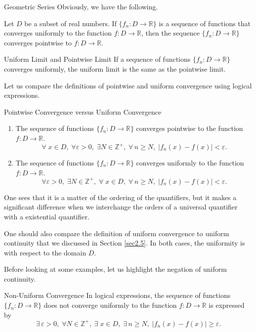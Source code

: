 \begin{example}[label=230305_16]{Geometric Series}
Obviously,  we have the following.
\begin{proposition}{}
Let $D$ be a subset of real numbers. If  $\{f_n:D\to\mathbb{R}\}$ is a sequence of functions that converges uniformly to the function $f:D\to\mathbb{R}$, then the sequence $\{f_n:D\to\mathbb{R}\}$  converges pointwise to  $f:D\to\mathbb{R}$.
\end{proposition}
\begin{highlight}{Uniform Limit and Pointwise Limit}
If a sequence of functions $\{f_n:D\to\mathbb{R}\}$  converges uniformly, the uniform limit is the same as the pointwise limit.
\end{highlight}



Let us compare the definitions of pointwise  and uniform convergence using logical expressions.
\begin{highlight}{Pointwise Convergence versus Uniform Convergence}
\begin{enumerate}[$\bullet$\;\;]
\item
The sequence of functions $\{f_n:D\to\mathbb{R}\}$ converges pointwise to the function $f:D\to\mathbb{R}$.
\[\forall\;x\in D,\; \forall \varepsilon>0,\;\exists N\in\mathbb{Z}^+,\;\forall \,n\geq N,\;|f_n(x)-f(x)|<\varepsilon.\]
\item
The sequence of functions $\{f_n:D\to\mathbb{R}\}$ converges uniformly to the function $f:D\to\mathbb{R}$.
\[\forall \varepsilon>0,\;\exists N\in\mathbb{Z}^+,\;\forall\;x\in D,\; \forall \,n\geq N,\;|f_n(x)-f(x)|<\varepsilon.\]
\end{enumerate}
\end{highlight}
One sees that it is a matter of the ordering of the quantifiers, but it makes a significant difference when we interchange the orders of a universal quantifier with  a existential quantifier.

 One should also compare the definition of uniform convergence to uniform continuity that we discussed in Section \ref{sec2.5}. In both cases, the uniformity is with respect to the domain $D$.

Before looking at some examples, let us highlight the negation of uniform continuity.
\begin{highlight}{Non-Uniform Convergence}
In logical expressions, the sequence of functions $\{f_n:D\to\mathbb{R}\}$ does not converge uniformly to the function $f:D\to\mathbb{R}$ is expressed by
\begin{equation}\label{eq230303_1}\exists \,\varepsilon>0,\;\forall N\in\mathbb{Z}^+,\;\exists\;x\in D,\; \exists \,n\geq N,\;|f_n(x)-f(x)|\geq \varepsilon.\end{equation}
\end{highlight}


\end{example}
